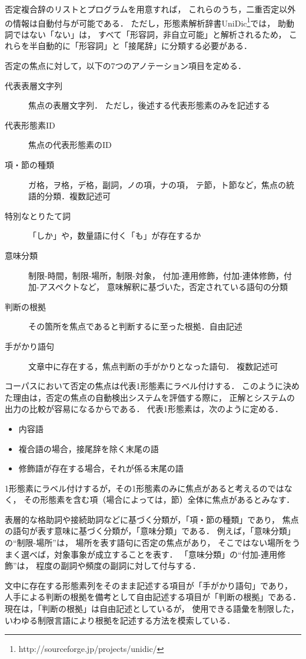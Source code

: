 \documentclass[japanese]{jnlp_1.4}
\begin{document}
否定複合辞のリストとプログラムを用意すれば，
これらのうち，二重否定以外の情報は自動付与が可能である．
ただし，形態素解析辞書UniDic\footnote{
http://sourceforge.jp/projects/unidic/}では，
助動詞ではない「ない」は，
すべて「形容詞，非自立可能」と解析されるため，
これらを半自動的に「形容詞」と「接尾辞」に分類する必要がある．

否定の焦点に対して，以下の7つのアノテーション項目を定める．
\begin{description}
\item[代表表層文字列] 焦点の表層文字列．
  ただし，後述する代表形態素のみを記述する
\item[代表形態素ID] 焦点の代表形態素のID
\item[項・節の種類] ガ格，ヲ格，デ格，副詞，ノの項，ナの項，
  テ節，ト節など，焦点の統語的分類．複数記述可
\item[特別なとりたて詞] 「しか」や，数量語に付く「も」が存在するか
\item[意味分類] 制限-時間，制限-場所，制限-対象，
  付加-連用修飾，付加-連体修飾，付加-アスペクトなど，
  意味解釈に基づいた，否定されている語句の分類
\item[判断の根拠] その箇所を焦点であると判断するに至った根拠．自由記述
\item[手がかり語句] 文章中に存在する，焦点判断の手がかりとなった語句．
  複数記述可 
\end{description}

コーパスにおいて否定の焦点は代表1形態素にラベル付けする．
このように決めた理由は，否定の焦点の自動検出システムを評価する際に，
正解とシステムの出力の比較が容易になるからである．
代表1形態素は，次のように定める．
\begin{itemize}
\item 内容語
\item 複合語の場合，接尾辞を除く末尾の語
\item 修飾語が存在する場合，それが係る末尾の語
\end{itemize}
1形態素にラベル付けするが，その1形態素のみに焦点があると考えるのではなく，
その形態素を含む項（場合によっては，節）全体に焦点があるとみなす．

表層的な格助詞や接続助詞などに基づく分類が，「項・節の種類」であり，
焦点の語句が表す意味に基づく分類が，「意味分類」である．
例えば，「意味分類」の``制限-場所''は，
場所を表す語句に否定の焦点があり，
そこではない場所をうまく選べば，対象事象が成立することを表す．
「意味分類」の``付加-連用修飾''は，
程度の副詞や頻度の副詞に対して付与する．

文中に存在する形態素列をそのまま記述する項目が「手がかり語句」であり，
人手による判断の根拠を備考として自由記述する項目が「判断の根拠」である．
現在は，「判断の根拠」は自由記述としているが，
使用できる語彙を制限した，
いわゆる制限言語により根拠を記述する方法を模索している．
\end{document}
